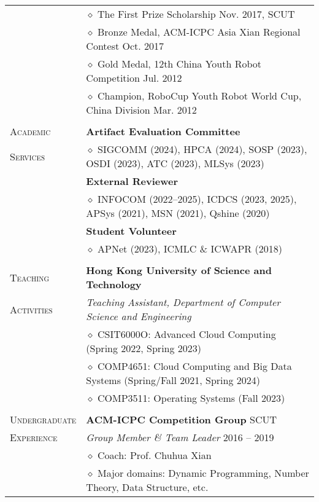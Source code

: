 \documentclass[letterpaper, 12pt]{article}
\begin{document}
\begin{longtable}{p{1.0in}p{5.8in}}
& $\diamond$ The First Prize Scholarship \hfill Nov. 2017, SCUT \\

& $\diamond$ Bronze Medal, ACM-ICPC Asia Xian Regional Contest \hfill Oct. 2017 \\

& $\diamond$ Gold Medal, 12th China Youth Robot Competition \hfill Jul. 2012 \\

& $\diamond$ Champion, RoboCup Youth Robot World Cup, China Division \hfill Mar. 2012 \\

& \\

{\textsc{Academic}}
& \textbf{Artifact Evaluation Committee} \\
{\textsc{Services}}
& $\diamond$ SIGCOMM (2024), HPCA (2024), SOSP (2023), OSDI (2023), ATC (2023), MLSys (2023) \\
& \textbf{External Reviewer} \\
& $\diamond$ INFOCOM (2022--2025), ICDCS (2023, 2025), APSys (2021), MSN (2021), Qshine (2020) \\
& \textbf{Student Volunteer} \\
& $\diamond$ APNet (2023), ICMLC \& ICWAPR (2018) \\
& \\

{\textsc{Teaching}}
& \textbf{Hong Kong University of Science and Technology} \\
{\textsc{Activities}}
& \textit{Teaching Assistant, Department of Computer Science and Engineering} \\
& $\diamond$ CSIT6000O: Advanced Cloud Computing (Spring 2022, Spring 2023) \\
& $\diamond$ COMP4651: Cloud Computing and Big Data Systems (Spring/Fall 2021, Spring 2024) \\
& $\diamond$ COMP3511: Operating Systems (Fall 2023) \\
& \\

{\textsc{Undergraduate}}
& \textbf{ACM-ICPC Competition Group} \hfill SCUT \\
{\textsc{Experience}}
& \textit{Group Member \& Team Leader} \hfill 2016 -- 2019 \\
& $\diamond$ Coach: Prof. Chuhua Xian \\
& $\diamond$ Major domains: Dynamic Programming, Number Theory, Data Structure, etc. \\


\end{longtable}
\end{document}
